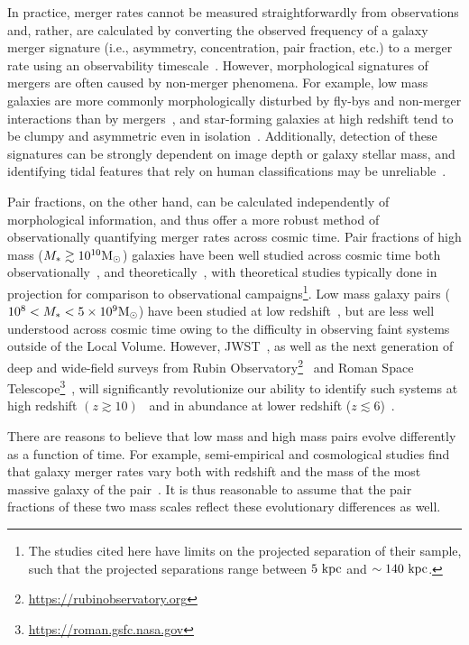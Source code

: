 \documentclass[linenumbers,twocolumn]{aastex631}
\begin{document}
    In practice, merger rates cannot be measured straightforwardly from observations and, rather, are calculated by converting the observed frequency of a galaxy merger signature (i.e., asymmetry, concentration, pair fraction, etc.) to a merger rate using an observability timescale~\citep[e.g.][]{Lotz2011}. However, morphological signatures of mergers are often caused by non-merger phenomena.
    For example, low mass galaxies are more commonly morphologically disturbed by fly-bys and non-merger interactions than by mergers~\citep{Martin2021}, 
    and star-forming galaxies at high redshift tend to be clumpy and asymmetric even in isolation~\citep{Wuyts2013}.
    Additionally, detection of these signatures can be strongly dependent on image depth or galaxy stellar mass, and identifying tidal features that rely on human classifications may be unreliable~\citep{Martin2022}.

    Pair fractions, on the other hand, can be calculated independently of morphological information, and thus offer a more robust method of observationally quantifying merger rates across cosmic time. 
    Pair fractions of high mass ($M_*\gtrsim10^{10}\mathrm{M}_\odot$) galaxies have been well studied across cosmic time both observationally~\citep[e.g.][]{Patton2002,Lin2004,Lin2008,Lotz2011,Ferreras2014, Man2016,Duncan2019}, and theoretically~\citep[e.g.][]{RG2015,Snyder2017,Snyder2023}, with theoretical studies typically done in projection for comparison to observational campaigns\footnote{The studies cited here have limits on the projected separation of their sample, such that the projected separations range between $5\,\mathrm{\,kpc}$ and $\sim140\,\mathrm{\,kpc}$.}.  
    Low mass galaxy pairs ($10^8<M_*<5\times10^9\mathrm{M}_\odot$) have been studied at low redshift~\citep[e.g.][]{Stierwalt2015,Pearson2016,Besla2018,Paudel2018,Luber2022},
    but are less well understood across cosmic time owing to the difficulty in observing faint systems outside of the Local Volume. 
    However, JWST~\citep{Gardner2006}, as well as the next generation of deep and wide-field surveys from Rubin Observatory\footnote{ \href{https://rubinobservatory.org/}{https://rubinobservatory.org}}~\citep{RUBIN2019} and Roman Space Telescope\footnote{\href{https://roman.gsfc.nasa.gov/}{https://roman.gsfc.nasa.gov}}~\citep{Spergel2015}, will significantly revolutionize our ability to identify such systems at high redshift $(z\gtrsim10)$~\citep{Behroozi2020} and in abundance at lower redshift ($z\lesssim6$)~\citep{Robertson2019a,Robertson2019b-LSST}.
    
    There are reasons to believe that low mass and high mass pairs evolve differently as a function of time.
    For example, semi-empirical and cosmological studies find that galaxy merger rates vary both with redshift and the mass of the most massive galaxy of the pair~\citep[see e.g.][]{Guo2008,Stewart2009,Hopkins2010,RG2015,Martin2021}.
    It is thus reasonable to assume that the pair fractions of these two mass scales reflect these evolutionary differences as well. 
\end{document}

